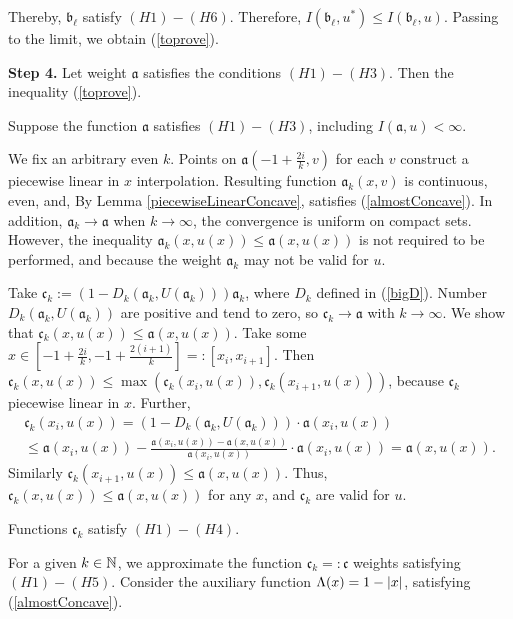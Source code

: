Thereby, $\mathfrak b_{\ell}$ satisfy $(H1)-(H6)$. Therefore, $I(\mathfrak b_{\ell}, u^*) \le I(\mathfrak b_{\ell}, u)$.
Passing to the limit, we obtain (\ref{toprove}).

\bigskip
{\bf Step 4.} Let weight $\mathfrak a$ satisfies the conditions $(H1)-(H3)$.
Then the inequality (\ref{toprove}).

Suppose the function $\mathfrak a$ satisfies $(H1)-(H3)$, including $I(\mathfrak a, u) < \infty$.

We fix an arbitrary even $k$.
Points on $\mathfrak a(-1 + \frac{2i}{k}, v)$ for each $v$ construct a piecewise linear in $x$ interpolation.
Resulting function $\mathfrak a_k(x, v)$ is continuous, even, and,
By Lemma \ref{piecewiseLinearConcave}, satisfies
(\ref{almostConcave}).
In addition, $\mathfrak a_k \to \mathfrak a$ when $k \to \infty$,
the convergence is uniform on compact sets.
However, the inequality $\mathfrak a_k(x, u(x)) \le \mathfrak a(x, u(x))$ is not required to be performed,
and because the weight $\mathfrak a_k$ may not be valid for $u$.

Take $\mathfrak c_k := (1 - D_k(\mathfrak a_k, U(\mathfrak a_k))) \mathfrak a_k$, where $D_k$ defined in (\ref{bigD}).
Number $D_k(\mathfrak a_k, U(\mathfrak a_k))$ are positive and tend to zero, so $\mathfrak c_k \to \mathfrak a$ with $k \to \infty$.
We show that $\mathfrak c_k(x, u(x)) \le \mathfrak a(x, u(x))$.
Take some
$x \in [-1 + \frac{2i}{k}, -1 + \frac{2(i + 1)}{k}] =: [x_i, x_{i + 1}]$.
Then $\mathfrak c_k(x, u(x)) \le \max( \mathfrak c_k(x_i, u(x)), \mathfrak c_k(x_{i + 1}, u(x)) )$, because
$\mathfrak c_k$ piecewise linear in $x$. Further,
\begin{multline*}
\mathfrak c_k (x_i, u (x)) = ( 1 - D_k (\mathfrak a_k, U (\mathfrak a_k))) \cdot \mathfrak a (x_i, u (x)) \\
\le \mathfrak a (x_i, u (x)) - \frac{\mathfrak a (x_i, u (x)) - \mathfrak a (x, u (x))}{\mathfrak a (x_i, u (x))} \cdot \mathfrak a ( x_i, u (x)) = \mathfrak a (x, u (x)).
\end{multline*}
Similarly $\mathfrak c_k(x_{i + 1}, u(x)) \le \mathfrak a(x, u(x))$.
Thus, $\mathfrak c_k(x, u(x)) \le \mathfrak a(x, u(x))$ for any $x$, and $\mathfrak c_k$ are valid for $u$.

Functions $\mathfrak c_k$ satisfy $(H1)-(H4)$.

For a given $k \in \mathbb N$, we approximate the function $\mathfrak c_k =: \mathfrak c$ weights satisfying $(H1)-(H5)$.
Consider the auxiliary function $\Lambda(x) = 1 - \left\vert x\right\vert$,
satisfying (\ref{almostConcave}).

